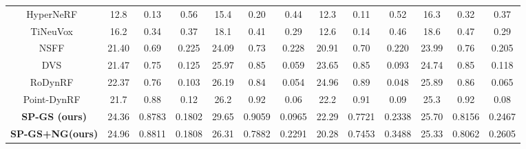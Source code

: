\begin{table}
{\begin{tabular}{c|*{3}{c}|*{3}{c}|*{3}{c}|*{3}{c}}
HyperNeRF~\cite{HyperNeRF} &12.8 & 0.13 & 0.56  & 15.4 & 0.20 & 0.44 & 12.3 & 0.11 & 0.52  &16.3 & 0.32 & 0.37 \\
TiNeuVox~\cite{TiNeuVox}& 16.2 & 0.34 & 0.37  & 18.1 & 0.41 & 0.29  & 12.6 & 0.14 & 0.46  & 18.6 & 0.47 & 0.29\\
NSFF~\cite{NSFF}  & 21.40 & 0.69 & 0.225 & 24.09 & 0.73 & 0.228 & 20.91 & 0.70 & 0.220 & 23.99 & 0.76 & 0.205 \\
DVS~\cite{DVS}  & 21.47 & 0.75 & 0.125 & 25.97 & 0.85 & 0.059 & 23.65 & 0.85 & 0.093 & 24.74 & 0.85 & 0.118 \\
RoDynRF~\cite{RoDynRF}& 22.37 & 0.76 & 0.103  & 26.19 & 0.84 & 0.054 & 24.96 & 0.89 & 0.048 & 25.89 & 0.86 & 0.065 \\
Point-DynRF~\cite{Point-DynRF}& 21.7 & 0.88 & 0.12 & 26.2 & 0.92 & 0.06 & 22.2 & 0.91 & 0.09 & 25.3 & 0.92 & 0.08 \\ 
\textbf{SP-GS (ours)}   & 24.36 & 0.8783 & 0.1802 & 29.65 &0.9059&0.0965 & 22.29 &0.7721&0.2338 & 25.70 & 0.8156 & 0.2467\\
\textbf{SP-GS+NG(ours)} & 24.96 & 0.8811 & 0.1808 & 26.31 &0.7882&0.2291 & 20.28 &0.7453&0.3488 & 25.33 & 0.8062 & 0.2605\\
\bottomrule
    \end{tabular}
    }
\end{table}

